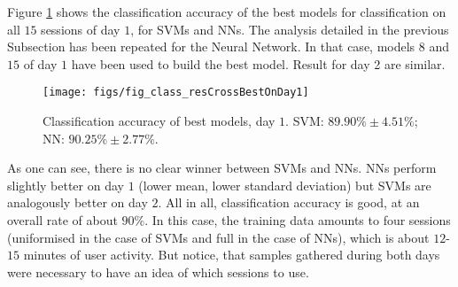 Figure \ref{fig:best_class} shows the classification accuracy of
the best models for classification on all $15$ sessions of day
$1$, for SVMs and NNs. The analysis detailed in the previous
Subsection has been repeated for the Neural Network. In that case,
models $8$ and $15$ of day $1$ have been used to build the best
model. Result for day 2 are similar.

\begin{figure} \centering
    \texttt{[image: figs/fig\_class\_resCrossBestOnDay1]} \\
  \caption{Classification accuracy of best models, day $1$. SVM: $89.90\% \pm 4.51\%$;
    NN: $90.25\% \pm 2.77\%$.}
  \label{fig:best_class}
\end{figure}

As one can see, there is no clear winner between SVMs and NNs. NNs
perform slightly better on day $1$ (lower mean, lower standard
deviation) but SVMs are analogously better on day $2$. All in all,
classification accuracy is good, at an overall rate of about
$90\%$. In this case, the training data amounts to four sessions
(uniformised in the case of SVMs and full in the case of NNs), which
is about $12$-$15$ minutes of user activity. But notice, that samples
gathered during both days were necessary to have an idea of which
sessions to use.
